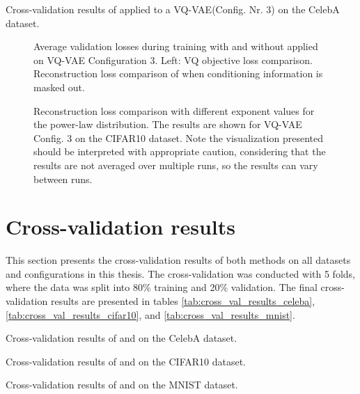 \begin{table}[H]
    \centering
    
    \caption{Cross-validation results of  applied to a VQ-VAE(Config. Nr. 3) on the CelebA dataset.}
    \label{tab:results_method2_vq_vae}
\end{table}
\begin{figure}[H]
    \centering
    \scalebox{0.48}{}
    \scalebox{0.48}{}
    \caption[Validation loss comparison during training of a VQ-VAE.]
    {
        Average validation losses during training with and without  applied on VQ-VAE Configuration 3.
        Left: VQ objective loss comparison.  Reconstruction loss comparison of when conditioning information is masked out.
    }
    \label{fig:results_method2_vq_vae}
\end{figure}
\begin{figure}[H]
    \centering
    \scalebox{0.48}{}
    \caption[Reconstruction loss comparison with different exponent values.]
    {
        Reconstruction loss comparison with different exponent values for the power-law distribution. The results are shown for VQ-VAE Config. 3 on the CIFAR10 dataset. Note the visualization presented should be interpreted with appropriate caution, considering that the results are not averaged over multiple runs, so the results can vary between runs.
    }
    \label{fig:reconstruction_loss_vs_exponential_value_vqvae}
\end{figure}

\section{Cross-validation results} \label{sec:cross_val_results}

This section presents the cross-validation results of both methods on all datasets and configurations in this thesis. The cross-validation was conducted with 5 folds, where the data was split into 80\% training and 20\% validation. The final cross-validation results are presented in tables \ref{tab:cross_val_results_celeba}, \ref{tab:cross_val_results_cifar10}, and \ref{tab:cross_val_results_mnist}.

\begin{table}[H]
    
    \caption{Cross-validation results of  and  on the CelebA dataset.}
    \label{tab:cross_val_results_celeba}
\end{table}
\begin{table}
    
    \caption{Cross-validation results of  and  on the CIFAR10 dataset.}
    \label{tab:cross_val_results_cifar10}
\end{table}

\begin{table}
    
    \caption{Cross-validation results of  and  on the MNIST dataset.}
    \label{tab:cross_val_results_mnist}
\end{table}